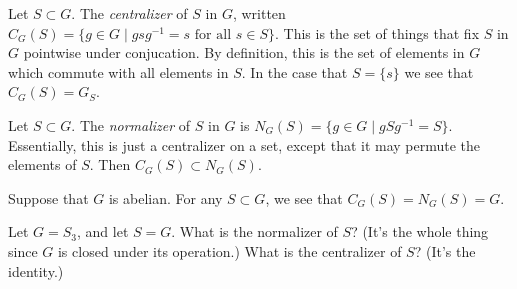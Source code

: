 \begin{definition}[Centralizer]
Let $S \subset G$. The \emph{centralizer} of $S$ in $G$, written $C_G(S) = \{g \in G \mid gsg^{-1} = s \text{ for all $s \in S$}\}$. This is the set of things that fix $S$ in $G$ pointwise under conjucation. By definition, this is the set of elements in $G$ which commute with all elements in $S$. In the case that $S = \{s\}$ we see that $C_G(S) = G_S$. 
\end{definition}

\begin{definition}[Normalizer]
Let $S \subset G$. The \emph{normalizer} of $S$ in $G$ is $N_G(S) = \{g \in G \mid gSg^{-1} = S\}$. Essentially, this is just a centralizer on a set, except that it may permute the elements of $S$. Then $C_G(S) \subset N_G(S)$.
\end{definition}

\begin{example}
Suppose that $G$ is abelian. For any $S \subset G$, we see that $C_G(S) = N_G(S) = G$.
\end{example}

\begin{example}
Let $G = S_3$, and let $S = G$. What is the normalizer of $S$? (It's the whole thing since $G$ is closed under its operation.) What is the centralizer of $S$? (It's the identity.)
\end{example}